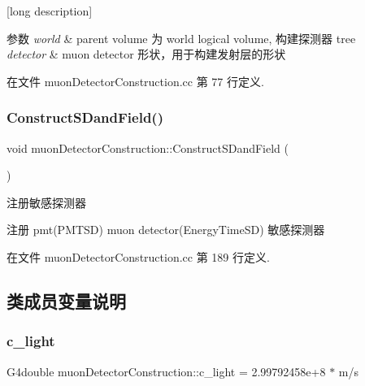 \mbox{[}long description\mbox{]}


\begin{DoxyParams}{参数}
{\em world} & parent volume 为 world logical volume, 构建探测器 tree \\
\hline
{\em detector} & muon detector 形状，用于构建发射层的形状 \\
\hline
\end{DoxyParams}


在文件 muon\+Detector\+Construction.\+cc 第 77 行定义.

\mbox{\label{classmuonDetectorConstruction_ab730c9af042466f6464c77a62a3c75df}} 
\subsubsection{\texorpdfstring{Construct\+S\+Dand\+Field()}{ConstructSDandField()}}
{\footnotesize\ttfamily void muon\+Detector\+Construction\+::\+Construct\+S\+Dand\+Field (\begin{DoxyParamCaption}{ }\end{DoxyParamCaption})\hspace{0.3cm}{\ttfamily [override]}}



注册敏感探测器 

注册 pmt(\+P\+M\+T\+S\+D) muon detector(\+Energy\+Time\+S\+D) 敏感探测器 

在文件 muon\+Detector\+Construction.\+cc 第 189 行定义.



\subsection{类成员变量说明}
\mbox{\label{classmuonDetectorConstruction_ae84a9c5b8ae8c23a525d2fac1c8574b4}} 
\subsubsection{\texorpdfstring{c\+\_\+light}{c\_light}}
{\footnotesize\ttfamily G4double muon\+Detector\+Construction\+::c\+\_\+light = 2.\+99792458e+8 $\ast$ m/s\hspace{0.3cm}{\ttfamily [private]}}



